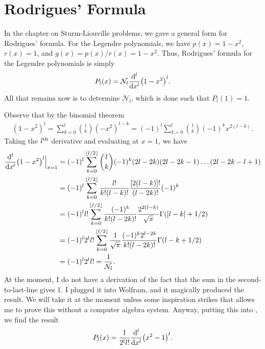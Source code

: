 \section{Rodrigues' Formula}

In the chapter on Sturm-Liouville problems, we gave a general form for Rodrigues' formula.
For the Legendre polynomials, we have $p(x) = 1-x^2$, $r(x) = 1$, and $g(x) = p(x)/r(x) = 1-x^2$.
Thus, Rodrigues' formula for the Legendre polynomials is simply
\begin{eqnarray}
    \label{eq:rodrigues-legendre}
    P_{l}(x) = \mathcal{N}_{l} \dv[l]{x} (1 - x^2)^{l}
.\end{eqnarray}
All that remains now is to determine $\mathcal{N}_{l}$, which is done such that $P_{l}(1) = 1$.

Observe that by the binomial theorem 
\begin{eqnarray}
    (1 - x^2)^{l} = \sum_{k=0}^{l} \binom{l}{k} (-x^2)^{l-k} = (-1)^{l} \sum_{k=0}^{l} \binom{l}{k} (-1)^{k} x^{2(l-k)}
.\end{eqnarray}
Taking the $l^{\rm th}$ derivative and evaluating at $x = 1$, we have
\begin{align}
    \dv[l]{x} (1 - x^2)^{l}\Big|_{x=1} &= (-1)^{l} \sum_{k = 0}^{\lfloor l/2 \rfloor} \binom{l}{k} (-1)^{k} (2l - 2k)(2l-2k-1)\ldots(2l-2k-l+1) \nonumber \\
    &= (-1)^{l} \sum_{k=0}^{\lfloor l/2 \rfloor} \frac{l!}{k!(l-k)!} \frac{[2(l-k)]!}{(l-2k)!} (-1)^{k} \nonumber \\
    &= (-1)^{l} l! \sum_{k=0}^{\lfloor l/2 \rfloor} \frac{(-1)^{k}}{k!(l-2k)!} \frac{2^{2(l-k)}}{\sqrt{\pi}} \Gamma([l-k] + 1/2) \nonumber \\
    &= (-1)^{l} 2^{l} l! \sum_{k=0}^{\lfloor l/2 \rfloor} \frac{1}{\sqrt{\pi}} \frac{(-1)^{k} 2^{l-2k}}{k!(l-2k)!} \Gamma(l-k+1/2) \nonumber \\
    &= (-1)^{l} 2^{l} l! = \frac{1}{\mathcal{N}_{l}}
.\end{align}
At the moment, I do not have a derivation of the fact that the sum in the second-to-last-line gives 1.
I plugged it into Wolfram, and it magically produced the result.
We will take it at the moment unless some inspiration strikes that allows me to prove this without a computer algebra system.
Anyway, putting this into , we find the result
\begin{eqnarray}
    P_{l}(x) = \frac{1}{2^{l} l!} \dv[l]{x} (x^2 - 1)^{l}
.\end{eqnarray}

